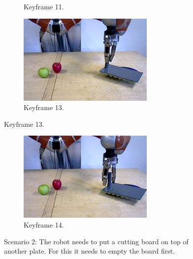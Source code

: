 \begin{figure}
\begin{subfigure}[t]{0.475\textwidth}
    \caption{Keyframe 11.}
    \label{fig:sec_usingaffordanceforplanning_results_scenario2_11}
  \end{subfigure}
  \hfill
  \begin{subfigure}[t]{0.475\textwidth}
    \includegraphics[width=\textwidth]{./figures/sec/planning/exec2/frame3985.jpg}
    \caption{Keyframe 13.}
    \label{fig:sec_usingaffordanceforplanning_results_scenario2_13}
  \end{subfigure}
\end{figure}
\begin{figure}\ContinuedFloat
  \centering
  \begin{subfigure}[t]{0.475\textwidth}
    \includegraphics[width=\textwidth]{./figures/sec/planning/exec2/frame4081.jpg}
    \caption{Keyframe 14.}
    \label{fig:sec_usingaffordanceforplanning_results_scenario2_14}
  \end{subfigure}
  \caption{Scenario 2: The robot needs to put a cutting board on top of another plate. For this it needs to empty the board first.}
  \label{fig:sec_usingaffordanceforplanning_results_scenario2}
\end{figure}





